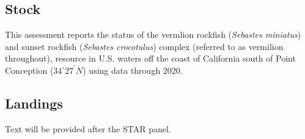 \documentclass[11pt,
  english,
  a4paper,
]{article}
\begin{document}

\hypertarget{stock}{%
\subsection*{Stock}\label{stock}}

\leavevmode\tagmcend\tagstructend

This assessment reports the status of the vermlion rockfish (\emph{Sebastes miniatus}) and sunset rockfish (\emph{Sebastes crocotulus}) complex (referred to as vermilion throughout), resource in U.S. waters off the coast of California south of Point Conception ($34^\circ 27^\prime N$) using data through 2020.


\hypertarget{landings}{%
\subsection*{Landings}\label{landings}}

\leavevmode\tagmcend\tagstructend

Text will be provided after the STAR panel.
\end{document}
